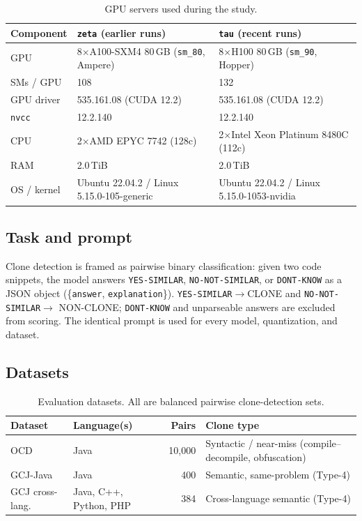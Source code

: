 \documentclass[11pt]{article}
\begin{document}
\begin{table}[htbp]
  \centering
  \caption{GPU servers used during the study.}
  \label{tab:hardware}
  \small
  \begin{tabular}{lll}
    \toprule
    \textbf{Component} & \textbf{\texttt{zeta} (earlier runs)} & \textbf{\texttt{tau} (recent runs)} \\
    \midrule
    GPU        & 8$\times$A100-SXM4 80\,GB (\texttt{sm\_80}, Ampere) & 8$\times$H100 80\,GB (\texttt{sm\_90}, Hopper) \\
    SMs / GPU  & 108 & 132 \\
    GPU driver & 535.161.08 (CUDA 12.2) & 535.161.08 (CUDA 12.2) \\
    \texttt{nvcc} & 12.2.140 & 12.2.140 \\
    CPU        & 2$\times$AMD EPYC 7742 (128c) & 2$\times$Intel Xeon Platinum 8480C (112c) \\
    RAM        & 2.0\,TiB & 2.0\,TiB \\
    OS / kernel & Ubuntu 22.04.2 / Linux 5.15.0-105-generic & Ubuntu 22.04.2 / Linux 5.15.0-1053-nvidia \\
    \bottomrule
  \end{tabular}
\end{table}

\subsection{Task and prompt}
Clone detection is framed as pairwise binary classification: given two code
snippets, the model answers \texttt{YES-SIMILAR}, \texttt{NO-NOT-SIMILAR}, or
\texttt{DONT-KNOW} as a JSON object (\{\texttt{answer}, \texttt{explanation}\}).
\texttt{YES-SIMILAR}$\rightarrow$CLONE and \texttt{NO-NOT-SIMILAR}$\rightarrow$
NON-CLONE; \texttt{DONT-KNOW} and unparseable answers are excluded from scoring.
The identical prompt is used for every model, quantization, and dataset.

\subsection{Datasets}
\begin{table}[htbp]
  \centering
  \caption{Evaluation datasets. All are balanced pairwise clone-detection sets.}
  \label{tab:datasets}
  \small
  \begin{tabular}{llrl}
    \toprule
    \textbf{Dataset} & \textbf{Language(s)} & \textbf{Pairs} & \textbf{Clone type} \\
    \midrule
    OCD              & Java                        & 10{,}000 & Syntactic / near-miss (compile--decompile, obfuscation) \\
    GCJ-Java         & Java                        & 400      & Semantic, same-problem (Type-4) \\
    GCJ cross-lang.  & Java, C++, Python, PHP      & 384      & Cross-language semantic (Type-4) \\
    \bottomrule
  \end{tabular}
\end{table}
\end{document}
